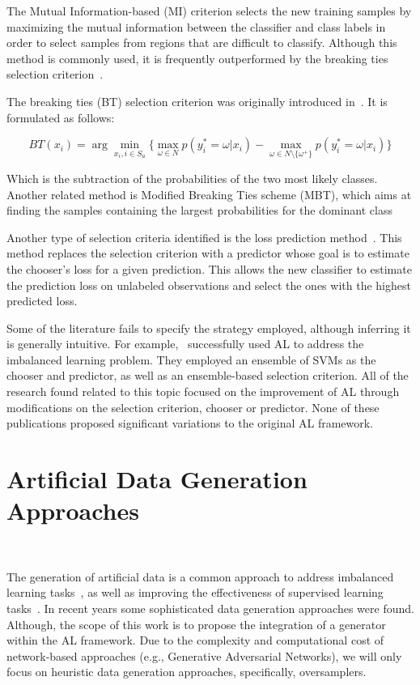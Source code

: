 \documentclass[parskip=full]{scrartcl}
\begin{document}
The Mutual Information-based (MI) criterion selects the new training samples by
maximizing the mutual information between the classifier and class labels in
order to select samples from regions that are difficult to classify. Although
this method is commonly used, it is frequently outperformed by the breaking ties
selection criterion~\cite{Li2011,Liu2018}.

The breaking ties (BT) selection criterion was originally introduced
in~\cite{Luo2003}. It is formulated as follows:

\begin{equation}\label{eq:breaking_ties}
    BT(x_i) = \arg \min_{x_i, i \in S_u}\{ \max_{\omega \in N}{p(y_{i}^{*}=\omega|x_i)} -
    \max_{\omega \in N\setminus\{\omega^{+}\}}{p(y_{i}^{*}=\omega|x_i)}\}
\end{equation}

Which is the subtraction of the probabilities of the two most likely classes.
Another related method is Modified Breaking Ties scheme (MBT), which aims at
finding the samples containing the largest probabilities for the dominant
class~\cite{Liu2018,Li2013a}

Another type of selection criteria identified is the loss prediction
method~\cite{Yoo2019}. This method replaces the selection criterion with a
predictor whose goal is to estimate the chooser's loss for a given
prediction. This allows the new classifier to estimate the prediction loss on
unlabeled observations and select the ones with the highest predicted loss.

Some of the literature fails to specify the strategy employed, although inferring
it is generally intuitive. For example,~\cite{Ertekin2007} successfully used AL
to address the imbalanced learning problem. They employed an ensemble of SVMs as
the chooser and predictor, as well as an ensemble-based selection criterion. All
of the research found related to this topic focused on the improvement of AL
through modifications on the selection criterion, chooser or predictor. None of
these publications proposed significant variations to the original AL framework.

\section{Artificial Data Generation Approaches}~\label{sec:ovs-sota}

The generation of artificial data is a common approach to address imbalanced
learning tasks~\cite{Kaur2019}, as well as improving the effectiveness of
supervised learning tasks~\cite{DeVries2017}. In recent years some sophisticated
data generation approaches were found.  Although, the scope of this work is to
propose the integration of a generator within the AL framework. Due to the
complexity and computational cost of network-based approaches (e.g., Generative
Adversarial Networks), we will only focus on heuristic data generation
approaches, specifically, oversamplers.
\end{document}
